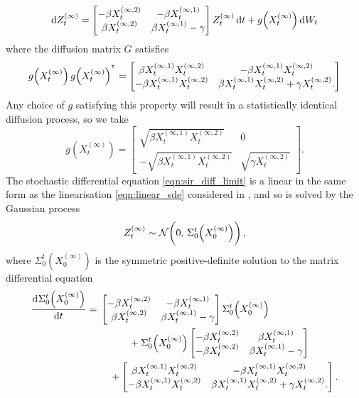 \begin{equation}
	\dif Z_t^{(\infty)} = \begin{bmatrix}
		-\beta X_t^{(\infty, 2)} & -\beta X_t^{(\infty, 1)}         \\
		\beta X_t^{(\infty, 2)}  & \beta X_t^{(\infty, 1)} - \gamma
	\end{bmatrix} Z_t^{(\infty)}\dif t + g\!\left(X_t^{(\infty)}\right)\dif W_t
	\label{eqn:sir_diff_limit}
\end{equation}
where the diffusion matrix \(G\) satisfies
\[
	g\!\left(X_t^{(\infty)}\right)g\!\left(X_t^{(\infty)}\right)^{^{\intercal}} = \begin{bmatrix}
		\beta X_t^{(\infty, 1)} X_t^{(\infty, 2)}  & -\beta X_t^{(\infty, 1)} X_t^{(\infty, 2)}                              \\
		-\beta X_t^{(\infty, 1)} X_t^{(\infty, 2)} & \beta X_t^{(\infty, 1)} X_t^{(\infty, 2)} + \gamma X_{t}^{(\infty, 2)}.
	\end{bmatrix}
\]
Any choice of \(g\) satisfying this property will result in a statistically identical diffusion process, so we take
\[
	g\!\left(X_t^{(\infty)}\right) = \begin{bmatrix}
		\sqrt{\beta X_t^{(\infty, 1)} X_t^{(\infty, 2)}}  & 0                               \\
		-\sqrt{\beta X_t^{(\infty, 1)} X_t^{(\infty, 2)}} & \sqrt{\gamma X_t^{(\infty, 2)}}
	\end{bmatrix}.
\]
The stochastic differential equation \cref{eqn:sir_diff_limit} is a linear in the same form as the linearisation \eqref{eqn:linear_sde} considered in , and so is solved by the Gaussian process
\[
	Z_t^{(\infty)} \sim\mathcal{N}\!\left(0,\, \Sigma_0^t\!\left(X_0^{(\infty)}\right)\right),
\]
where \(\Sigma_0^t\!\left(X_0^{(\infty)}\right)\) is the symmetric positive-definite solution to the matrix differential equation
\[
	\dod{\Sigma_0^t\!\left(X_0^{(\infty)}\right)}{t} = \begin{multlined}[t]
		\begin{bmatrix}
			-\beta X_t^{(\infty, 2)} & -\beta X_t^{(\infty, 1)}         \\
			\beta X_t^{(\infty, 2)}  & \beta X_t^{(\infty, 1)} - \gamma
		\end{bmatrix}\Sigma_0^t\!\left(X_0^{(\infty)}\right) \\
		+ \Sigma_0^t\!\left(X_0^{(\infty)}\right)\begin{bmatrix}
			-\beta X_t^{(\infty, 2)} & \beta X_t^{(\infty, 1)}          \\
			-\beta X_t^{(\infty, 2)} & \beta X_t^{(\infty, 1)} - \gamma
		\end{bmatrix} \\
		+ \begin{bmatrix}
			\beta X_t^{(\infty, 1)} X_t^{(\infty, 2)}  & -\beta X_t^{(\infty, 1)} X_t^{(\infty, 2)}                              \\
			-\beta X_t^{(\infty, 1)} X_t^{(\infty, 2)} & \beta X_t^{(\infty, 1)} X_t^{(\infty, 2)} + \gamma X_{t}^{(\infty, 2)}.
		\end{bmatrix}.
	\end{multlined}
\]


